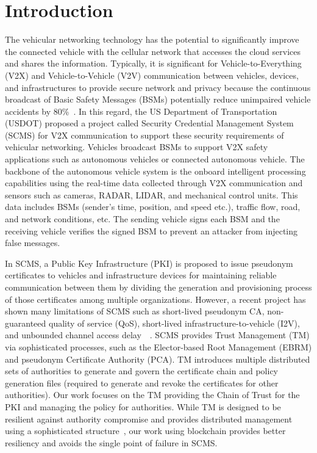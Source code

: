 \section{Introduction}
\label{intro}

The vehicular networking technology has the potential to significantly improve the connected vehicle with the cellular network that accesses the cloud services and shares the information. Typically, it is significant for Vehicle-to-Everything (V2X) and Vehicle-to-Vehicle (V2V) communication between vehicles, devices, and infrastructures to provide secure network and privacy because the continuous broadcast of Basic Safety Messages (BSMs) potentially reduce unimpaired vehicle accidents by 80\%~\cite{brecht2019security}. In this regard, the US Department of Transportation (USDOT) proposed a project called Security Credential Management System (SCMS) for V2X communication to support these security requirements of vehicular networking. Vehicles broadcast BSMs to support V2X safety applications such as autonomous vehicles or connected autonomous vehicle. The backbone of the autonomous vehicle system is the onboard intelligent processing capabilities using the real-time data collected through V2X communication and sensors such as cameras, RADAR, LIDAR, and mechanical control units. This data includes BSMs (sender’s time, position, and speed etc.), traffic flow, road, and network conditions, etc. The sending vehicle signs each BSM and the receiving vehicle verifies the signed BSM to prevent an attacker from injecting false messages.
 

In SCMS, a Public Key Infrastructure (PKI) is proposed to issue pseudonym certificates to vehicles and infrastructure devices for maintaining reliable communication between them by dividing the generation and provisioning process of those certificates among multiple organizations. However, a recent project has shown many limitations of SCMS such as short-lived pseudonym CA, non-guaranteed quality of service (QoS), short-lived infrastructure-to-vehicle (I2V), and unbounded channel access delay~\cite{furtado2018threat}~\cite{qayyum2020securing}. SCMS provides Trust Management (TM) via sophisticated processes, such as the Elector-based Root Management (EBRM) and pseudonym Certificate Authority (PCA). TM introduces multiple distributed sets of authorities to generate and govern the certificate chain and policy generation files (required to generate and revoke the certificates for other authorities). Our work focuses on the TM providing the Chain of Trust for the PKI and managing the policy for authorities. While TM is designed to be resilient against authority compromise and provides distributed management using a sophisticated structure~\cite{brecht2019security}, our work using blockchain provides better resiliency and avoids the single point of failure in SCMS.          



